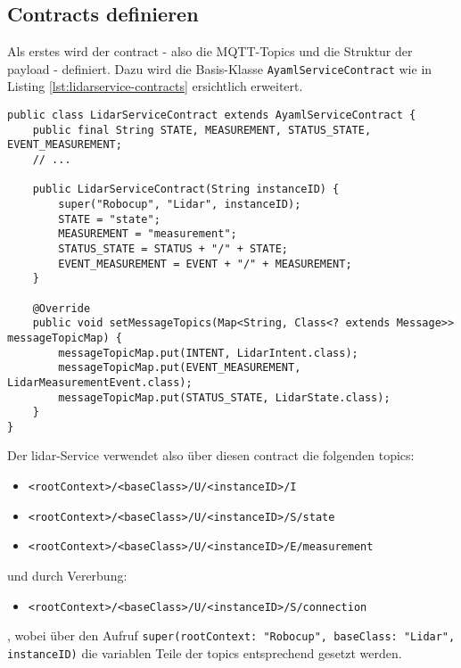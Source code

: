 \subsection{Contracts definieren}
Als erstes wird der \Gls{contract} - also die MQTT-Topics und die Struktur der \Gls{payload} - definiert. Dazu wird die Basis-Klasse \verb|AyamlServiceContract| wie in Listing \ref{lst:lidarservice-contracts} ersichtlich erweitert.
\begin{lstlisting}[caption={TiM55x-Service - Contracts},label={lst:lidarservice-contracts}]
public class LidarServiceContract extends AyamlServiceContract {
    public final String STATE, MEASUREMENT, STATUS_STATE, EVENT_MEASUREMENT;
    // ...

    public LidarServiceContract(String instanceID) {
        super("Robocup", "Lidar", instanceID);
        STATE = "state";
        MEASUREMENT = "measurement";
        STATUS_STATE = STATUS + "/" + STATE;
        EVENT_MEASUREMENT = EVENT + "/" + MEASUREMENT;
    }

    @Override
    public void setMessageTopics(Map<String, Class<? extends Message>> messageTopicMap) {
        messageTopicMap.put(INTENT, LidarIntent.class);
        messageTopicMap.put(EVENT_MEASUREMENT, LidarMeasurementEvent.class);
        messageTopicMap.put(STATUS_STATE, LidarState.class);
    }
}
\end{lstlisting}
Der \acrshort{lidar}-Service verwendet also über diesen \Gls{contract} die folgenden \Glspl{topic}:
\begin{itemize}
	\item \verb|<rootContext>/<baseClass>/U/<instanceID>/I|
	\item \verb|<rootContext>/<baseClass>/U/<instanceID>/S/state|
	\item \verb|<rootContext>/<baseClass>/U/<instanceID>/E/measurement|
\end{itemize}
und durch Vererbung:
\begin{itemize}
	\item \verb|<rootContext>/<baseClass>/U/<instanceID>/S/connection|
\end{itemize}
, wobei über den Aufruf \verb|super(rootContext: "Robocup", baseClass: "Lidar", instanceID)| die variablen Teile der \Glspl{topic} entsprechend gesetzt werden.

